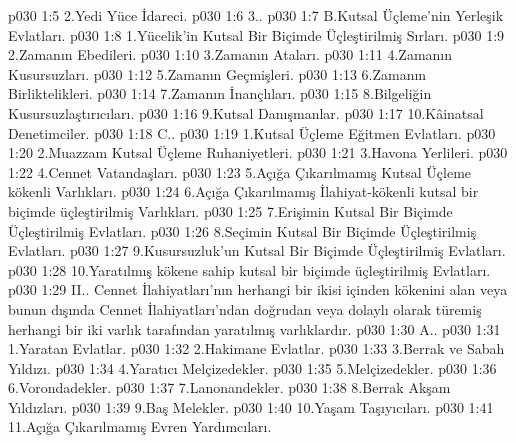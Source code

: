 \vs p030 1:5 2.\bibnobreakspace Yedi Yüce İdareci.
\vs p030 1:6 3.\bibnobreakspace {}.
\vs p030 1:7 B.\bibnobreakspace Kutsal Üçleme’nin Yerleşik Evlatları.
\vs p030 1:8 1.\bibnobreakspace Yücelik’in Kutsal Bir Biçimde Üçleştirilmiş Sırları.
\vs p030 1:9 2.\bibnobreakspace Zamanın Ebedileri.
\vs p030 1:10 3.\bibnobreakspace Zamanın Ataları.
\vs p030 1:11 4.\bibnobreakspace Zamanın Kusursuzları.
\vs p030 1:12 5.\bibnobreakspace Zamanın Geçmişleri.
\vs p030 1:13 6.\bibnobreakspace Zamanın Birliktelikleri.
\vs p030 1:14 7.\bibnobreakspace Zamanın İnançlıları.
\vs p030 1:15 8.\bibnobreakspace Bilgeliğin Kusursuzlaştırıcıları.
\vs p030 1:16 9.\bibnobreakspace Kutsal Danışmanlar.
\vs p030 1:17 10.\bibnobreakspace Kâinatsal Denetimciler.
\vs p030 1:18 C.\bibnobreakspace {}.
\vs p030 1:19 1.\bibnobreakspace Kutsal Üçleme Eğitmen Evlatları.
\vs p030 1:20 2.\bibnobreakspace Muazzam Kutsal Üçleme Ruhaniyetleri.
\vs p030 1:21 3.\bibnobreakspace Havona Yerlileri.
\vs p030 1:22 4.\bibnobreakspace Cennet Vatandaşları.
\vs p030 1:23 5.\bibnobreakspace Açığa Çıkarılmamış Kutsal Üçleme kökenli Varlıkları.
\vs p030 1:24 6.\bibnobreakspace Açığa Çıkarılmamış İlahiyat\hyp{}kökenli kutsal bir biçimde üçleştirilmiş Varlıkları.
\vs p030 1:25 7.\bibnobreakspace Erişimin Kutsal Bir Biçimde Üçleştirilmiş Evlatları.
\vs p030 1:26 8.\bibnobreakspace Seçimin Kutsal Bir Biçimde Üçleştirilmiş Evlatları.
\vs p030 1:27 9.\bibnobreakspace Kusursuzluk’un Kutsal Bir Biçimde Üçleştirilmiş Evlatları.
\vs p030 1:28 10.\bibnobreakspace Yaratılmış kökene sahip kutsal bir biçimde üçleştirilmiş Evlatları.
\vs p030 1:29 II.\bibnobreakspace {}. Cennet İlahiyatları’nın herhangi bir ikisi içinden kökenini alan veya bunun dışında Cennet İlahiyatları’ndan doğrudan veya dolaylı olarak türemiş herhangi bir iki varlık tarafından yaratılmış varlıklardır.
\vs p030 1:30 A.\bibnobreakspace {}.
\vs p030 1:31 1.\bibnobreakspace Yaratan Evlatlar.
\vs p030 1:32 2.\bibnobreakspace Hakimane Evlatlar.
\vs p030 1:33 3.\bibnobreakspace Berrak ve Sabah Yıldızı.
\vs p030 1:34 4.\bibnobreakspace Yaratıcı Melçizedekler.
\vs p030 1:35 5.\bibnobreakspace Melçizedekler.
\vs p030 1:36 6.\bibnobreakspace Vorondadekler.
\vs p030 1:37 7.\bibnobreakspace Lanonandekler.
\vs p030 1:38 8.\bibnobreakspace Berrak Akşam Yıldızları.
\vs p030 1:39 9.\bibnobreakspace Baş Melekler.
\vs p030 1:40 10.\bibnobreakspace Yaşam Taşıyıcıları.
\vs p030 1:41 11.\bibnobreakspace Açığa Çıkarılmamış Evren Yardımcıları.
